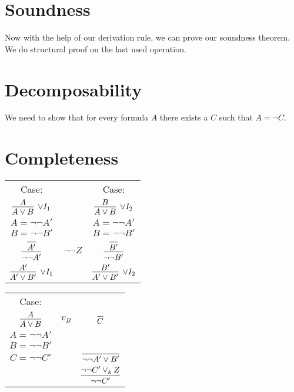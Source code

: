 \documentclass{article}
\begin{document}
\section{Soundness}

Now with the help of our derivation rule, we can prove our soundness theorem. We do structural proof on the last used operation.

\section{Decomposability}

We need to show that for every formula $A$ there exists a $C$ such that $A = \neg C$.

\section{Completeness}

\begin{center}
\begin{tabular}{ccc}
Case: & & Case: \\
$\infer[\lor I_1]{A \lor B}{A}$ & & $\infer[\lor I_2]{A \lor B}{B}$ \\
$A = \neg\neg A'$ & & $A = \neg\neg A'$ \\
$B = \neg\neg B'$ & & $B = \neg\neg B'$ \\
$\infer{\neg\neg A'}{\infer{A'}{}}$ & $\neg\neg Z$ & $\infer{\neg\neg B'}{\infer{B'}{}}$ \\
$\infer[\lor I_1]{A' \lor B'}{A'}$ & & $\infer[\lor I_2]{A' \lor B'}{B'}$ \\
\end{tabular}
\end{center}

\begin{center}
\begin{tabular}{ccc}
Case: & & \\
$\infer{A \lor B}{A}$ & $v_B$ & $\infer{C}{}$ \\
$A = \neg\neg A'$ & & \\
$B = \neg\neg B'$ & & \\
$C = \neg\neg C'$ & & $\infer{\neg\neg A' \lor B'}{}$ \\
& & $\infer{\neg\neg C'}{\neg\neg C' \lor_{k} Z}$ \\
\end{tabular}
\end{center}
\end{document}
